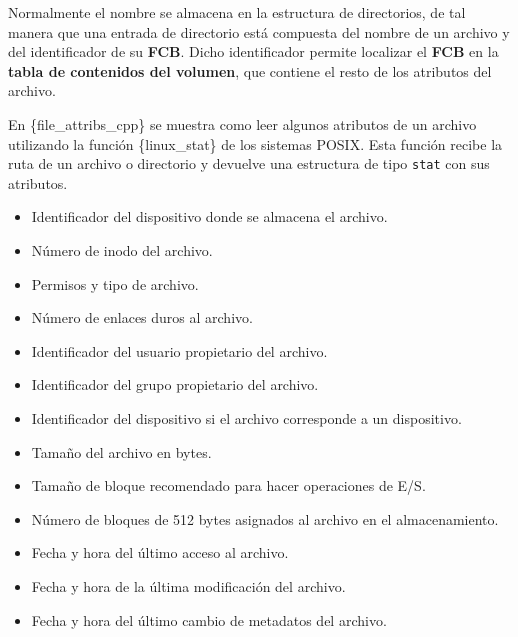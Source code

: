 Normalmente el nombre se almacena en la estructura de directorios, de
tal manera que una entrada de directorio está compuesta del nombre de un
archivo y del identificador de su \textbf{FCB}. Dicho identificador
permite localizar el \textbf{FCB} en la \textbf{tabla de contenidos del
volumen}, que contiene el resto de los atributos del archivo.

En \{file\_attribs\_cpp\} se muestra como leer algunos atributos de un
archivo utilizando la función \{linux\_stat\} de los sistemas POSIX.
Esta función recibe la ruta de un archivo o directorio y devuelve una
estructura de tipo \texttt{stat} con sus atributos.

\begin{Shaded}
\begin{Highlighting}[]
\OperatorTok{\{}
\OperatorTok{;}         
\OperatorTok{;}         
\OperatorTok{;}        
\OperatorTok{;}       
\OperatorTok{;}         
\OperatorTok{;}         
\OperatorTok{;}        
\OperatorTok{;}        
\OperatorTok{;}     
\OperatorTok{;}      
    \OperatorTok{;} 
    \OperatorTok{;} 
    \OperatorTok{;} 
\OperatorTok{\};}
\end{Highlighting}
\end{Shaded}

\begin{itemize}
\item
  Identificador del dispositivo donde se almacena el archivo.
\item
  Número de inodo del archivo.
\item
  Permisos y tipo de archivo.
\item
  Número de enlaces duros al archivo.
\item
  Identificador del usuario propietario del archivo.
\item
  Identificador del grupo propietario del archivo.
\item
  Identificador del dispositivo si el archivo corresponde a un
  dispositivo.
\item
  Tamaño del archivo en bytes.
\item
  Tamaño de bloque recomendado para hacer operaciones de E/S.
\item
  Número de bloques de 512 bytes asignados al archivo en el
  almacenamiento.
\item
  Fecha y hora del último acceso al archivo.
\item
  Fecha y hora de la última modificación del archivo.
\item
  Fecha y hora del último cambio de metadatos del archivo.
\end{itemize}


